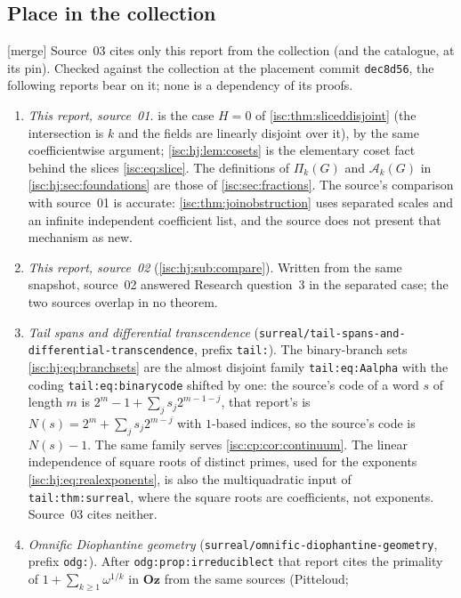 \documentclass[11pt,letterpaper]{article}
\theoremstyle{definition}
\theoremstyle{remark}
\newcommand{\Oz}{\mathbf{Oz}}
\newcommand{\A}[2]{\mathcal A_{#1}(#2)}
\newcommand{\PiG}[2]{\Pi_{#1}(#2)}
\newcommand{\rpath}[1]{\nolinkurl{#1}}%
\newcommand{\lbl}[1]{\nolinkurl{#1}}%
\newcommand{\mtag}{\textup{[merge]}}%
\numberwithin{equation}{section}
\begin{document}
\subsection{Place in the collection}\label{isc:hj:sec:collection}

\mtag{} Source~03 cites only this report from the collection (and the
catalogue, at its pin). Checked against the collection at the placement
commit \texttt{dec8d56}, the following reports bear on it; none is a
dependency of its proofs.
\begin{enumerate}[leftmargin=*,itemsep=3pt]
\item \emph{This report, source~01.}  is the case
$H=0$ of \cref{isc:thm:sliceddisjoint} (the intersection is $k$ and the
fields are linearly disjoint over it), by the same coefficientwise
argument; \cref{isc:hj:lem:cosets} is the elementary coset fact behind the
slices \eqref{isc:eq:slice}. The definitions of $\PiG{k}{G}$ and
$\A{k}{G}$ in \cref{isc:hj:sec:foundations} are those of
\cref{isc:sec:fractions}. The source's comparison with source~01 is
accurate: \cref{isc:thm:joinobstruction} uses separated scales and an
infinite independent coefficient list, and the source does not present
that mechanism as new.
\item \emph{This report, source~02} (\cref{isc:hj:sub:compare}). Written
from the same snapshot, source~02 answered Research question~3 in the
separated case; the two sources overlap in no theorem.
\item \emph{Tail spans and differential transcendence}
(\rpath{surreal/tail-spans-and-differential-transcendence}, prefix
\texttt{tail:}). The binary-branch sets \eqref{isc:hj:eq:branchsets} are the
almost disjoint family \lbl{tail:eq:Aalpha} with the coding
\lbl{tail:eq:binarycode} shifted by one: the source's code of a word $s$ of
length $m$ is $2^m-1+\sum_js_j2^{m-1-j}$, that report's is
$N(s)=2^m+\sum_js_j2^{m-j}$ with $1$-based indices, so the source's code is
$N(s)-1$. The same family serves \cref{isc:cp:cor:continuum}. The
linear independence of square roots of distinct primes, used for the
exponents \eqref{isc:hj:eq:realexponents}, is also the multiquadratic input
of \lbl{tail:thm:surreal}, where the square roots are coefficients, not
exponents. Source~03 cites neither.
\item \emph{Omnific Diophantine geometry}
(\rpath{surreal/omnific-diophantine-geometry}, prefix \texttt{odg:}). After
\lbl{odg:prop:irreduciblect} that report cites the primality of
$1+\sum_{k\ge1}\omega^{1/k}$ in $\Oz$ from the same sources (Pitteloud;

\end{enumerate}
\end{document}

